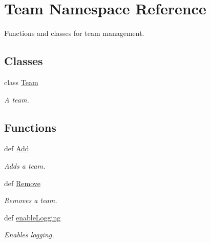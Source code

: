 \hypertarget{namespace_team}{
\section{\-Team \-Namespace \-Reference}
\label{namespace_team}
}


\-Functions and classes for team management.  


\subsection*{\-Classes}
\begin{DoxyCompactItemize}
\item 
class \hyperlink{class_team_1_1_team}{\-Team}
\begin{DoxyCompactList}\small\item\em \-A team. \end{DoxyCompactList}\end{DoxyCompactItemize}
\subsection*{\-Functions}
\begin{DoxyCompactItemize}
\item 
def \hyperlink{namespace_team_a3aa3c6d7d30a6d820bf641e0bc95e8c0}{\-Add}
\begin{DoxyCompactList}\small\item\em \-Adds a team. \end{DoxyCompactList}\item 
def \hyperlink{namespace_team_a3c8a40385ed4e0ddea55e51286c607fa}{\-Remove}
\begin{DoxyCompactList}\small\item\em \-Removes a team. \end{DoxyCompactList}\item 
def \hyperlink{namespace_team_abaa01768200015ab5ae4afc3d2d54eec}{enable\-Logging}
\begin{DoxyCompactList}\small\item\em \-Enables logging. \end{DoxyCompactList}\end{DoxyCompactItemize}
